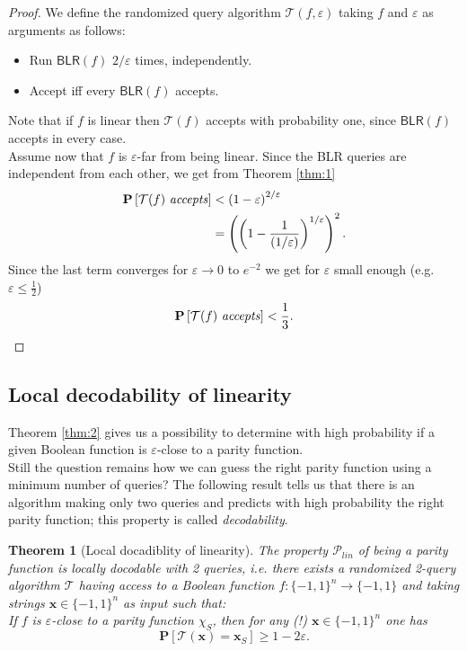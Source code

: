 \documentclass[a4paper]{article}
\newcommand{\prob}{\mathbf{P}}
\newcommand{\eps}{\varepsilon}
\newcommand{\boldx}{\boldsymbol{x}}
\theoremstyle{plain}
\newtheorem{theorem}{Theorem}
\theoremstyle{definition}
\theoremstyle{remark}
\begin{document}
\begin{proof}
  We define the randomized query algorithm \(\mathcal{T}(f,\eps)\)
  taking \(f\) and \(\eps\) as arguments as follows: 
  \begin{itemize}
  \item Run \(\textsf{BLR}(f)\) \(2/\eps\) times,
    independently.
  \item Accept iff every \(\textsf{BLR}(f)\) accepts. 
  \end{itemize}
  Note that if \(f\) is linear then \(\mathcal{T}(f)\) accepts with
  probability one, since \(\textsf{BLR}(f)\) accepts in every case.\\
  Assume now that \(f\) is \(\eps\)-far from being linear. Since the
  \textsf{BLR} queries are independent from each other, we get from
  Theorem \ref{thm:1}
  \begin{align}
    \prob\left[\mathcal{T}(f) \text{ \textit{accepts}}\right] 
    &< \left(1-\eps\right)^{2/\eps} \\
    &= \left(\left(1-\frac{1}{(1/\eps)}\right)^{1/\eps}\right)^2.
  \end{align}
  Since the last term converges for \(\eps \rightarrow 0\) to
  \(e^{-2}\) we get for \(\eps\) small enough (e.g. \(\eps \leq
  \frac{1}{2}\)) 
  \[\prob\left[\mathcal{T}(f) \text{ \textit{accepts}}\right] < \frac{1}{3}.\]
\end{proof}


\subsection{Local decodability of linearity}
\label{sec:local-decod-line}

Theorem \ref{thm:2} gives us a possibility to determine with high
probability if a given Boolean function is \(\eps\)-close to a parity
function. \\
Still the question remains how we can guess the right parity function
using a minimum number of queries? The following result tells us that
there is an algorithm making only two queries and predicts with high
probability the right parity function; this property is called
\emph{decodability}. 

\begin{theorem}[Local docadiblity of linearity] \label{thm:3}
  The property \(\mathcal{P}_{lin}\) of being a parity function is
  \emph{locally docodable} with 2 queries, i.e. there exists a
  randomized 2-query algorithm \(\mathcal{T}\) having access to a
  Boolean function \(f:\{-1,1\}^n \rightarrow \{-1,1\}\) and taking
  strings \(\boldx \in \{-1,1\}^n\) as input such that: \\
  If \(f\) is \(\eps\)-close to a  parity function \(\chi_S\), then
  for any (!) \(\boldx \in \{-1,1\}^n\) one has    
  \begin{equation}
    \label{eq:5}
    \prob\left[\mathcal{T}(\boldx) = \boldx_S\right] \geq 1 - 2\eps. 
  \end{equation}
\end{theorem}
\end{document}
